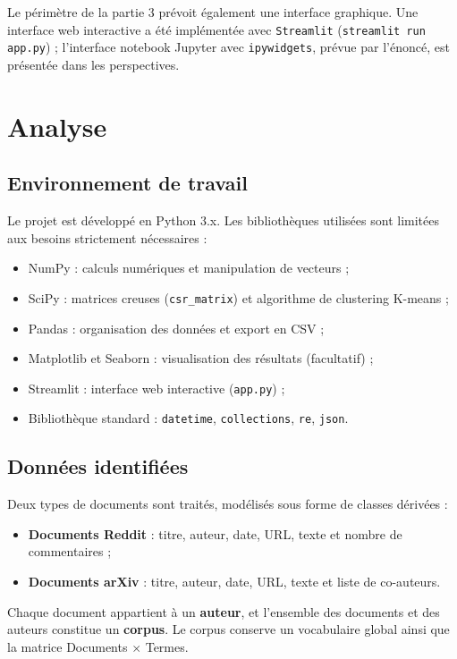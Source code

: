 \documentclass[12pt,a4paper]{article}
\begin{document}
Le périmètre de la partie 3 prévoit également une interface graphique. Une interface web interactive a été implémentée avec \texttt{Streamlit} (\texttt{streamlit run app.py}) ; l'interface notebook Jupyter avec \texttt{ipywidgets}, prévue par l'énoncé, est présentée dans les perspectives.

\section{Analyse}

\subsection{Environnement de travail}

Le projet est développé en Python 3.x. Les bibliothèques utilisées sont limitées aux besoins strictement nécessaires :

\begin{itemize}
    \item NumPy : calculs numériques et manipulation de vecteurs ;
    \item SciPy : matrices creuses (\texttt{csr\_matrix}) et algorithme de clustering K-means ;
    \item Pandas : organisation des données et export en CSV ;
    \item Matplotlib et Seaborn : visualisation des résultats (facultatif) ;
    \item Streamlit : interface web interactive (\texttt{app.py}) ;
    \item Bibliothèque standard : \texttt{datetime}, \texttt{collections}, \texttt{re}, \texttt{json}.
\end{itemize}

\subsection{Données identifiées}

Deux types de documents sont traités, modélisés sous forme de classes dérivées :

\begin{itemize}
    \item \textbf{Documents Reddit} : titre, auteur, date, URL, texte et nombre de commentaires ;
    \item \textbf{Documents arXiv} : titre, auteur, date, URL, texte et liste de co-auteurs.
\end{itemize}

Chaque document appartient à un \textbf{auteur}, et l'ensemble des documents et des auteurs constitue un \textbf{corpus}. Le corpus conserve un vocabulaire global ainsi que la matrice Documents $\times$ Termes.
\end{document}
